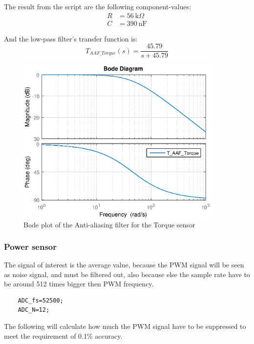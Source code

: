 The result from the script are the following component-values:	
\begin{equation}
	\begin{split}
	R &= \SI{56}{\kilo\Omega}\\
	C &= \SI{390}{\nano\F}
	\end{split}
\end{equation}
	
And the low-pass filter's transfer function is:
\begin{equation}
	T_{{AAF\_Torque}}(s) = \frac{45.79}{s+ 45.79}
\end{equation}
	
	
\begin{figure}[H]
	\centering
	\includegraphics [width=4in]{Hardware/Pictures/FilterAnalyse_01.eps}
	\caption{Bode plot of the Anti-aliasing filter for the Torque sensor}
	\label{fig:BODE_AAF_Torque}
\end{figure}
	
	
\subsubsection*{Power sensor}
The signal of interest is the average value, because the PWM signal will be seen as noise signal, and must be filtered out, also because else the sample rate have to be around 512 times bigger then PWM frequency. 
	
\begin{lstlisting}
	ADC_fs=52500;
	ADC_N=12;
\end{lstlisting}
	
The following will calculate how much the PWM signal have to be suppressed to meet the requirement of 0.1\% accuracy.
	
